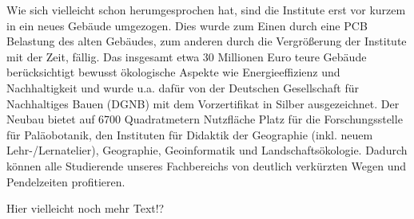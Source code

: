 Wie sich vielleicht schon herumgesprochen hat, sind die Institute erst vor kurzem in ein neues Gebäude umgezogen. Dies wurde zum Einen durch eine PCB Belastung des alten Gebäudes, zum anderen durch die Vergrößerung der Institute mit der Zeit, fällig. Das insgesamt etwa 30 Millionen Euro teure Gebäude berücksichtigt bewusst ökologische Aspekte wie Energieeffizienz und Nachhaltigkeit und wurde u.a. dafür von der Deutschen Gesellschaft für Nachhaltiges Bauen (DGNB) mit dem Vorzertifikat in Silber ausgezeichnet. Der Neubau bietet auf 6700 Quadratmetern Nutzfläche Platz für die Forschungsstelle für Paläobotanik, den Instituten für Didaktik der Geographie (inkl. neuem Lehr-/Lernatelier), Geographie, Geoinformatik und Landschaftsökologie. Dadurch können alle Studierende unseres Fachbereichs von deutlich verkürzten Wegen und Pendelzeiten profitieren.

Hier vielleicht noch mehr Text!?


